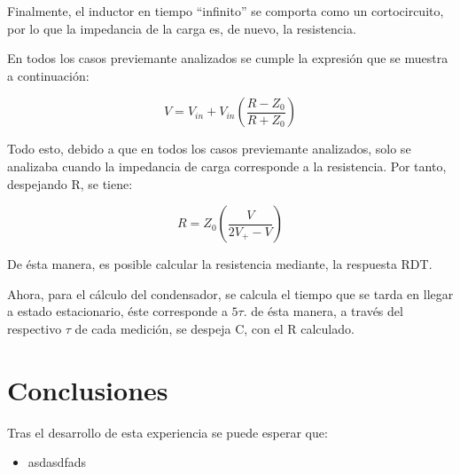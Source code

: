 \documentclass[11pt,onecolumn]{article}
\begin{document}
Finalmente, el inductor en tiempo ``infinito'' se comporta como un cortocircuito, por lo que la impedancia de la carga es, de nuevo, la resistencia.

En todos los casos previemante  analizados se cumple la expresión que se muestra a continuación:


\[
V = V_{in}  + V_{in} \left( {\frac{{R - Z_0 }}{{R + Z_0 }}} \right)
\]

Todo esto, debido a que en todos los casos previemante analizados, solo se analizaba cuando la impedancia de carga corresponde a la resistencia. Por tanto, despejando R, se tiene:

\[
R=Z_0 \left( {\frac{V}{{2V_ +   - V}}} \right)
\]

De ésta manera, es posible calcular la resistencia mediante, la respuesta RDT.

Ahora, para el cálculo del condensador, se calcula el tiempo que se tarda en  llegar a estado estacionario, éste corresponde a $5\tau$. de ésta manera, a través del respectivo $\tau$ de cada medición, se despeja C, con el R calculado.


\newpage
\section{Conclusiones}

Tras el desarrollo de esta experiencia se puede esperar que:
\begin{itemize}
\item asdasdfads

\end{itemize}
\end{document}
